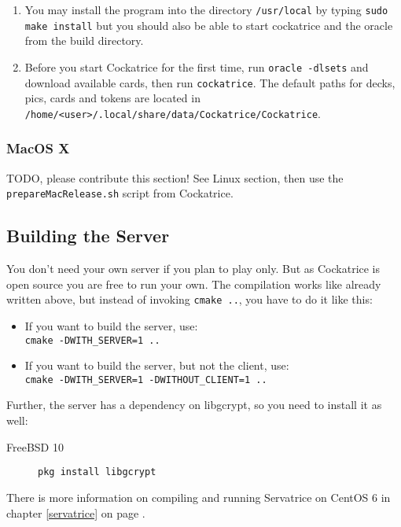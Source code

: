 \documentclass[a4paper]{scrbook}
\newcommand{\shellcmd}[1]{\texttt{\scriptsize #1}}
\begin{document}
\begin{enumerate}
{make}\\
\begin{framed}
If you have linking errors with pthread\_* add 'pthread' to the ``target\_link\_libraries'' entry in the \shellcmd{CMakeFiles.txt} in \shellcmd{Cockatrice/common}, e.g. for Xubuntu, then continue the make process.
\end{framed}
 \item You may install the program into the directory \shellcmd{/usr/local} by typing \shellcmd{sudo make install} but you should also be able to start 
 cockatrice and the oracle from the build directory.
 \item Before you start Cockatrice for the first time, run \shellcmd{oracle -dlsets} and download available cards, then run \shellcmd{cockatrice}.
The default paths for decks, pics, cards and tokens are located in \\ \shellcmd{/home/<user>/.local/share/data/Cockatrice/Cockatrice}.
\end{enumerate}

\subsubsection{MacOS X}
TODO, please contribute this section! See Linux section, then use the \shellcmd{prepareMacRelease.sh} script from Cockatrice.

\subsection{Building the Server}
You don't need your own server if you plan to play only. But as Cockatrice is open source you are free to run your own.
The compilation works like already written above, but instead of invoking \shellcmd{cmake ..}, you have to do it like this:
\begin{itemize}
 \item If you want to build the server, use:\\ \shellcmd{cmake -DWITH\_SERVER=1 ..}
 \item If you want to build the server, but not the client, use:\\ \shellcmd{cmake -DWITH\_SERVER=1 -DWITHOUT\_CLIENT=1 ..}
\end{itemize}
Further, the server has a dependency on libgcrypt, so you need to install it as well:
\begin{description}
 \item[FreeBSD 10] \shellcmd{pkg install libgcrypt}
\end{description}
There is more information on compiling and running Servatrice on CentOS 6 in chapter \ref{servatrice} on page \pageref{servatrice}.
\end{document}

